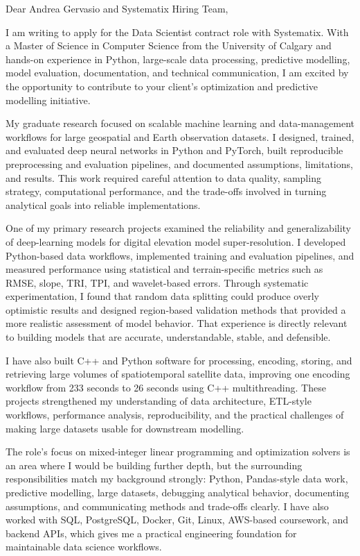 \documentclass[11pt]{letter}
\begin{document}
\begin{letter}{}

\opening{Dear Andrea Gervasio and Systematix Hiring Team,}

I am writing to apply for the Data Scientist contract role with Systematix. With a Master of Science in Computer Science from the University of Calgary and hands-on experience in Python, large-scale data processing, predictive modelling, model evaluation, documentation, and technical communication, I am excited by the opportunity to contribute to your client's optimization and predictive modelling initiative.

My graduate research focused on scalable machine learning and data-management workflows for large geospatial and Earth observation datasets. I designed, trained, and evaluated deep neural networks in Python and PyTorch, built reproducible preprocessing and evaluation pipelines, and documented assumptions, limitations, and results. This work required careful attention to data quality, sampling strategy, computational performance, and the trade-offs involved in turning analytical goals into reliable implementations.

One of my primary research projects examined the reliability and generalizability of deep-learning models for digital elevation model super-resolution. I developed Python-based data workflows, implemented training and evaluation pipelines, and measured performance using statistical and terrain-specific metrics such as RMSE, slope, TRI, TPI, and wavelet-based errors. Through systematic experimentation, I found that random data splitting could produce overly optimistic results and designed region-based validation methods that provided a more realistic assessment of model behavior. That experience is directly relevant to building models that are accurate, understandable, stable, and defensible.

I have also built C++ and Python software for processing, encoding, storing, and retrieving large volumes of spatiotemporal satellite data, improving one encoding workflow from 233 seconds to 26 seconds using C++ multithreading. These projects strengthened my understanding of data architecture, ETL-style workflows, performance analysis, reproducibility, and the practical challenges of making large datasets usable for downstream modelling.

The role's focus on mixed-integer linear programming and optimization solvers is an area where I would be building further depth, but the surrounding responsibilities match my background strongly: Python, Pandas-style data work, predictive modelling, large datasets, debugging analytical behavior, documenting assumptions, and communicating methods and trade-offs clearly. I have also worked with SQL, PostgreSQL, Docker, Git, Linux, AWS-based coursework, and backend APIs, which gives me a practical engineering foundation for maintainable data science workflows.


\end{letter}
\end{document}
